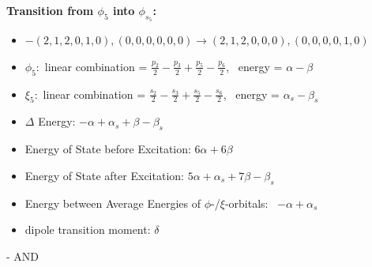 \documentclass[12pt,a4paper]{article}
\begin{document}
        \noindent\textbf{Transition from $\phi_{5}$ into $\phi_{s_{5}}$:}
        \begin{itemize}
            \item $- (2, 1, 2, 0, 1, 0), (0, 0, 0, 0, 0, 0) \rightarrow (2, 1, 2, 0, 0, 0), (0, 0, 0, 0, 1, 0)$
        
            \item $\phi_{5}:$ linear combination = $\frac{p_{2}}{2} - \frac{p_{3}}{2} + \frac{p_{5}}{2} - \frac{p_{6}}{2}$, \
            energy = $\alpha - \beta$
            
            \item $\xi_{5}:$ linear combination = $\frac{s_{2}}{2} - \frac{s_{3}}{2} + \frac{s_{5}}{2} - \frac{s_{6}}{2}$, \
            energy = $\alpha_{s} - \beta_{s}$
            
            \item $\Delta$ Energy: $- \alpha + \alpha_{s} + \beta - \beta_{s}$
            \item Energy of State before Excitation: $6 \alpha + 6 \beta$
            \item Energy of State after Excitation: $5 \alpha + \alpha_{s} + 7 \beta - \beta_{s}$
            \item Energy between Average Energies of $\phi$-/$\xi$-orbitals: \
            $- \alpha + \alpha_{s}$
        
            \item dipole transition moment: $\delta$
        
        \end{itemize}
        
 -  AND 
\end{document}
